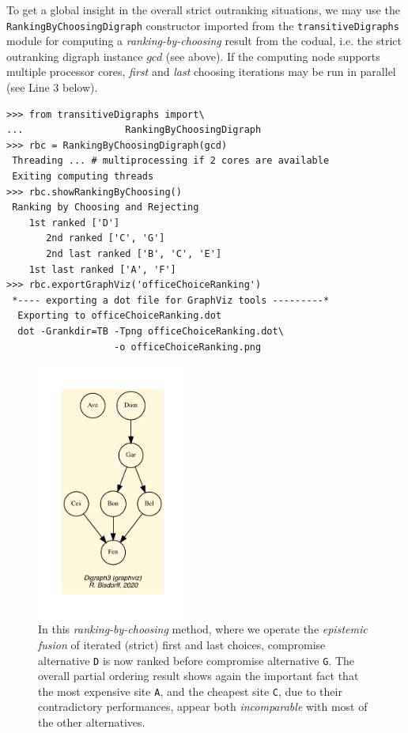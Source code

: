 To get a global insight in the overall strict outranking situations, we may use the \texttt{RankingByChoosingDigraph} constructor imported from the \texttt{transitiveDigraphs} module for computing a \emph{ranking-by-choosing} result from the codual, i.e. the strict outranking digraph instance $gcd$ (see above). If the computing node supports multiple processor cores, \emph{first} and \emph{last} choosing iterations may be run in parallel (see Line 3 below).
\begin{lstlisting}
>>> from transitiveDigraphs import\
...                  RankingByChoosingDigraph
>>> rbc = RankingByChoosingDigraph(gcd)
 Threading ... # multiprocessing if 2 cores are available
 Exiting computing threads
>>> rbc.showRankingByChoosing()
 Ranking by Choosing and Rejecting
    1st ranked ['D']
       2nd ranked ['C', 'G']
       2nd last ranked ['B', 'C', 'E']
    1st last ranked ['A', 'F']
>>> rbc.exportGraphViz('officeChoiceRanking')
 *---- exporting a dot file for GraphViz tools ---------*
  Exporting to officeChoiceRanking.dot
  dot -Grankdir=TB -Tpng officeChoiceRanking.dot\
                   -o officeChoiceRanking.png
\end{lstlisting}
\begin{figure}[h]
\sidecaption[t]
\includegraphics[width=5cm]{Figures/officeChoiceRanking.pdf}
\caption{In this \emph{ranking-by-choosing} method, where we operate the \emph{epistemic fusion} of iterated (strict) first and last choices, compromise alternative \texttt{D} is now ranked before compromise alternative \texttt{G}. The overall partial ordering result shows again the important fact that the most expensive site \texttt{A}, and the cheapest site \texttt{C}, due to their contradictory performances, appear both \emph{incomparable} with most of the other alternatives.} 
\label{fig:4.4}       %
\end{figure}
